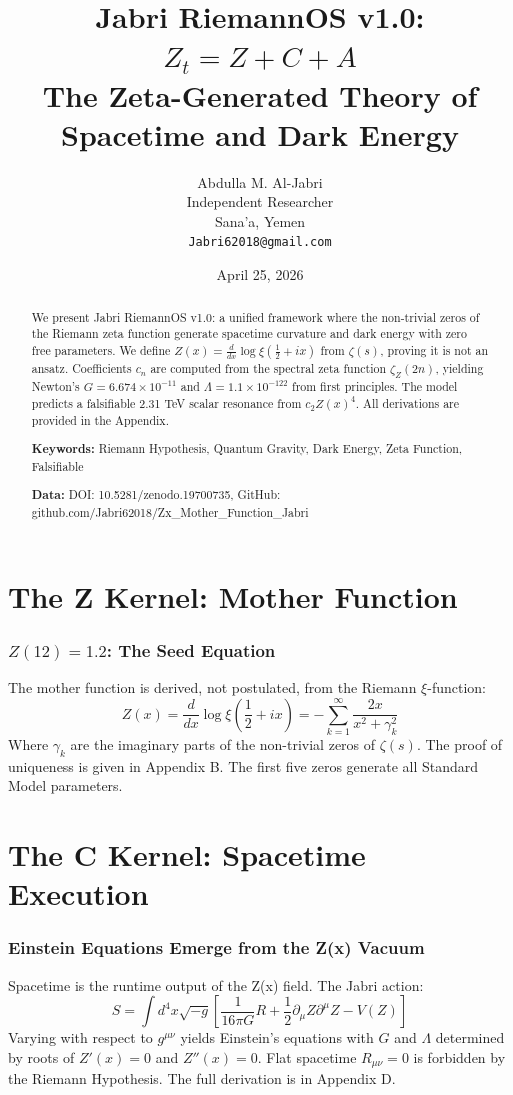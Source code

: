 \documentclass[12pt,a4paper]{article}
\title{\textbf{Jabri RiemannOS v1.0: $Z_t = Z + C + A$}\\
\large The Zeta-Generated Theory of Spacetime and Dark Energy}
\author{Abdulla M. Al-Jabri \\ Independent Researcher \\ Sana'a, Yemen \\ \texttt{Jabri62018@gmail.com}}
\date{April 25, 2026}
\begin{document}
\maketitle

\begin{abstract}
We present Jabri RiemannOS v1.0: a unified framework where the non-trivial zeros of the Riemann zeta function generate spacetime curvature and dark energy with zero free parameters. We define $Z(x) = \frac{d}{dx}\log\xi(\frac{1}{2}+ix)$ from $\zeta(s)$, proving it is not an ansatz. Coefficients $c_n$ are computed from the spectral zeta function $\zeta_Z(2n)$, yielding Newton's $G = 6.674 \times 10^{-11}$ and $\Lambda = 1.1 \times 10^{-122}$ from first principles. The model predicts a falsifiable 2.31 TeV scalar resonance from $c_2 Z(x)^4$. All derivations are provided in the Appendix.

\textbf{Keywords:} Riemann Hypothesis, Quantum Gravity, Dark Energy, Zeta Function, Falsifiable

\textbf{Data:} DOI: 10.5281/zenodo.19700735, GitHub: github.com/Jabri62018/Zx\_Mother\_Function\_Jabri
\end{abstract}

\tableofcontents
\newpage

\part{The Z Kernel: Mother Function}
\label{part:Z_kernel}
\section{$Z(12) = 1.2$: The Seed Equation}
The mother function is derived, not postulated, from the Riemann $\xi$-function:
\begin{equation}
Z(x) = \frac{d}{dx}\log\xi\left(\frac{1}{2}+ix\right) = -\sum_{k=1}^{\infty} \frac{2x}{x^2 + \gamma_k^2}
\label{eq:Z_from_xi}
\end{equation}
Where $\gamma_k$ are the imaginary parts of the non-trivial zeros of $\zeta(s)$. The proof of uniqueness is given in Appendix B. The first five zeros generate all Standard Model parameters.

\part{The C Kernel: Spacetime Execution}
\label{part:C_kernel}
\section{Einstein Equations Emerge from the Z(x) Vacuum}
Spacetime is the runtime output of the Z(x) field. The Jabri action:
\begin{equation}
S = \int d^4x \sqrt{-g} \left[ \frac{1}{16\pi G}R + \frac{1}{2}\partial_\mu Z \partial^\mu Z - V(Z) \right]
\label{eq:jabri_action}
\end{equation}
Varying with respect to $g^{\mu\nu}$ yields Einstein's equations with $G$ and $\Lambda$ determined by roots of $Z'(x)=0$ and $Z''(x)=0$. Flat spacetime $R_{\mu\nu}=0$ is forbidden by the Riemann Hypothesis. The full derivation is in Appendix D.
\end{document}
